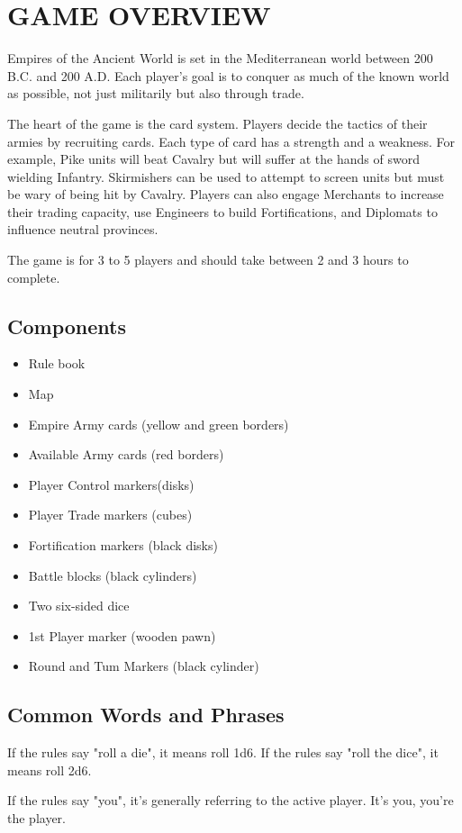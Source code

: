 \section{GAME OVERVIEW}

Empires of the Ancient World is set in the Mediterranean world between 200 B.C. and 200 A.D. Each player’s goal is to conquer as much of the known world as possible, not just militarily but also through trade.

The heart of the game is the card system. Players decide the tactics of their armies by recruiting cards. Each type of card has a strength and a weakness. For example, Pike units will beat Cavalry but will suffer at the hands of sword wielding Infantry. Skirmishers can be used to attempt to screen units but must be wary of being hit by Cavalry. Players can also engage Merchants to increase their trading capacity, use Engineers to build Fortifications, and Diplomats to influence neutral provinces.

The game is for 3 to 5 players and should take between 2 and 3 hours to complete.

\subsection{Components}

\begin{itemize}[nosep]
  \item Rule book
  \item Map
  \item Empire Army cards (yellow and green borders)
  \item Available Army cards (red borders)
  \item Player Control markers(disks)
  \item Player Trade markers (cubes)
  \item Fortification markers (black disks)
  \item Battle blocks (black cylinders)
  \item Two six-sided dice
  \item 1st Player marker (wooden pawn)
  \item Round and Tum Markers (black cylinder)
\end{itemize}

\subsection{Common Words and Phrases}

If the rules say "roll a die", it means roll 1d6. If the rules say "roll the dice", it means roll 2d6.

If the rules say "you", it's generally referring to the active player. It's you, you're the player.